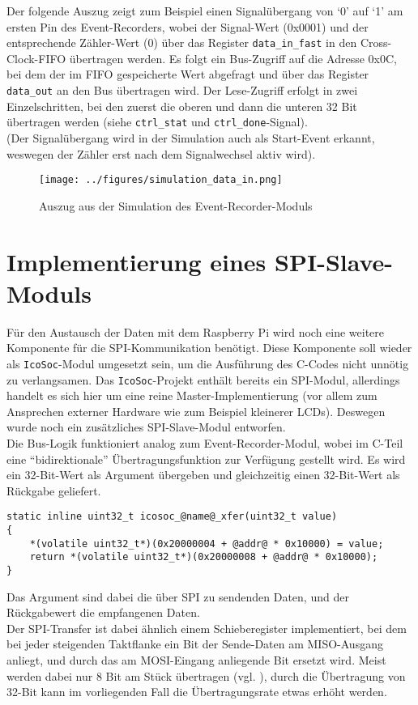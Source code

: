 {Der folgende Auszug zeigt zum Beispiel einen Signalübergang von `0' auf `1' am ersten Pin des Event-Recorders, wobei der Signal-Wert (0x0001) und der entsprechende Zähler-Wert (0) über das Register {\tt data\_in\_fast} in den Cross-Clock-FIFO übertragen werden. Es folgt ein Bus-Zugriff auf die Adresse 0x0C, bei dem der im FIFO gespeicherte Wert abgefragt und über das Register {\tt data\_out} an den Bus übertragen wird. Der Lese-Zugriff erfolgt in zwei Einzelschritten, bei den zuerst die oberen und dann die unteren 32 Bit übertragen werden (siehe {\tt ctrl\_stat} und {\tt ctrl\_done}-Signal). \\
(Der Signalübergang wird in der Simulation auch als Start-Event erkannt, weswegen der Zähler erst nach dem Signalwechsel aktiv wird). 
\begin{figure}[H]
	\centering
	\captionsetup{justification=centering,margin=2cm}
		\texttt{[image: ../figures/simulation\_data\_in.png]}
		\caption[Auszug aus der Simulation des Event-Recorder-Moduls]{Auszug aus der Simulation des Event-Recorder-Moduls}
	\label{fig:ice40_pmod_pins}
\end{figure}

\section{Implementierung eines SPI-Slave-Moduls}
\label{ch:Implementierung:sec:SPI-Slave}

Für den Austausch der Daten mit dem Raspberry Pi wird noch eine weitere Komponente für die SPI-Kommunikation benötigt. Diese Komponente soll wieder als {\tt IcoSoc}-Modul umgesetzt sein, um die Ausführung des C-Codes nicht unnötig zu verlangsamen. Das {\tt IcoSoc}-Projekt enthält bereits ein SPI-Modul, allerdings handelt es sich hier um eine reine Master-Implementierung (vor allem zum Ansprechen externer Hardware wie zum Beispiel kleinerer LCDs). 
Deswegen wurde noch ein zusätzliches SPI-Slave-Modul entworfen.\\
Die Bus-Logik funktioniert analog zum Event-Recorder-Modul, wobei im C-Teil eine ``bidirektionale'' Übertragungsfunktion zur Verfügung gestellt wird. Es wird ein 32-Bit-Wert als Argument übergeben und gleichzeitig einen 32-Bit-Wert als Rückgabe geliefert. 
\begin{verbatim}
static inline uint32_t icosoc_@name@_xfer(uint32_t value)  
{
    *(volatile uint32_t*)(0x20000004 + @addr@ * 0x10000) = value;
    return *(volatile uint32_t*)(0x20000008 + @addr@ * 0x10000);
}
\end{verbatim}
Das Argument sind dabei die über SPI zu sendenden Daten, und der Rückgabewert die empfangenen Daten.\\
Der SPI-Transfer ist dabei ähnlich einem Schieberegister implementiert, bei dem bei jeder steigenden Taktflanke ein Bit der Sende-Daten am MISO-Ausgang anliegt, und durch das am MOSI-Eingang anliegende Bit ersetzt wird.
Meist werden dabei nur 8 Bit am Stück übertragen (vgl. \cite{wiki:SPI}), durch die Übertragung von 32-Bit kann im vorliegenden Fall die Übertragungsrate etwas erhöht werden. 

}
